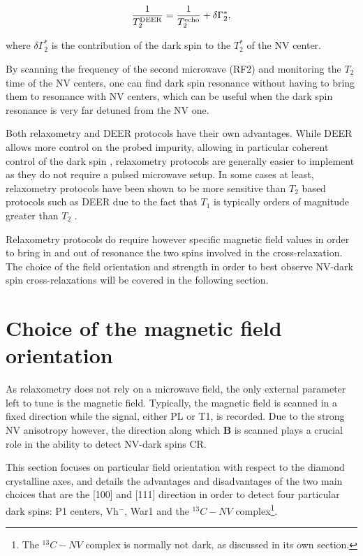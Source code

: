 \documentclass[a4paper,11pt]{report}
\begin{document}
\begin{equation}
\frac{1}{T_2^{\rm DEER}}=\frac{1}{T_2^{\rm echo}} + \delta \Gamma_2^*,
\end{equation}

where $\delta \Gamma_2^*$ is the contribution of the dark spin to the $T_2^*$ of the NV center.

By scanning the frequency of the second microwave (RF2) and monitoring the $T_2$ time of the NV centers, one can find dark spin resonance without having to bring them to resonance with NV centers, which can be useful when the dark spin resonance is very far detuned from the NV one.

Both relaxometry and DEER protocols have their own advantages. While DEER allows more control on the probed impurity, allowing in particular coherent control of the dark spin \citep{sushkov2014magnetic}, relaxometry protocols are generally easier to implement as they do not require a pulsed microwave setup. In some cases at least, relaxometry protocols have been shown to be more sensitive than $T_2$ based protocols such as DEER due to the fact that $T_1$ is typically orders of magnitude greater than $T_2$ \citep{steinert2013magnetic}.

Relaxometry protocols do require however specific magnetic field values in order to bring in and out of resonance the two spins involved in the cross-relaxation. The choice of the field orientation and strength in order to best observe NV-dark spin cross-relaxations will be covered in the following section.

\section{Choice of the magnetic field orientation}

As relaxometry does not rely on a microwave field, the only external parameter left to tune is the magnetic field. Typically, the magnetic field is scanned in a fixed direction while the signal, either PL or T1, is recorded. Due to the strong NV anisotropy however, the direction along which $\mathbf{B}$ is scanned plays a crucial role in the ability to detect NV-dark spins CR.

This section focuses on particular field orientation with respect to the diamond crystalline axes, and details the advantages and disadvantages of the two main choices that are the [100] and [111] direction in order to detect four particular dark spins: P1 centers, Vh$^-$, War1 and the $^{13}C-NV$ complex\footnote{The $^{13}C-NV$ complex is normally not dark, as discussed in its own section.}.
\end{document}
